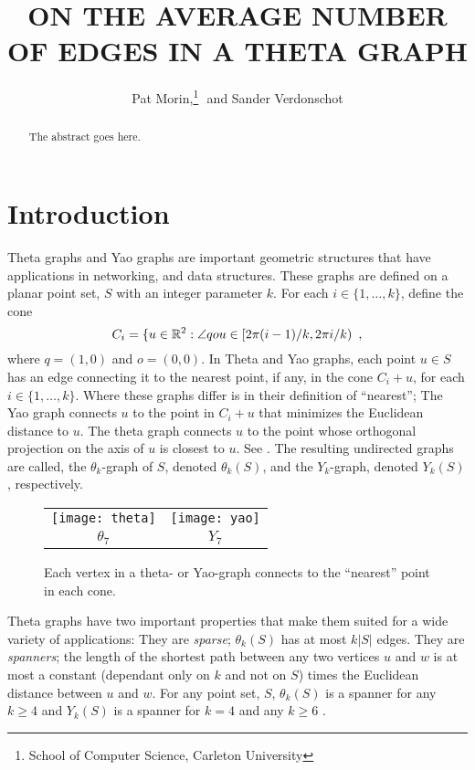 \documentclass{patmorin}
\title{\MakeUppercase{On the Average Number of Edges in a Theta Graph}}
\author{Pat Morin,\thanks{School of Computer Science, Carleton University}\,\,
         and Sander Verdonschot\footnotemark[1]}
\begin{document}
\maketitle

\begin{abstract}
  The abstract goes here.
\end{abstract}

\section{Introduction}

Theta graphs \cite{keil.gutwin:classes} and Yao graphs \cite{yao:blah}
are important geometric structures that have applications in networking,
and data structures.  These graphs are defined on a planar point set,
$S$ with an integer parameter $k$.  For each $i\in\{1,\ldots, k\}$,
define the cone
\[ 
   C_i=\{u\in \mathbb{R}^2: \angle qou\in [2\pi(i-1)/k,2\pi i/k) \enspace ,
\]
where $q=(1,0)$ and $o=(0,0)$.  In Theta and Yao graphs, each point $u\in
S$ has an edge connecting it to the nearest point, if any, in the cone
$C_i+u$, for each $i\in\{1,\ldots,k\}$. Where these graphs differ is in
their definition of ``nearest''; The Yao graph connects $u$ to the point
in $C_i+u$ that minimizes the Euclidean distance to $u$.  The theta graph
connects $u$ to the point whose orthogonal projection on the axis of $u$
is closest to $u$.  See . The resulting undirected
graphs are called, the $\theta_k$-graph of $S$, denoted $\theta_k(S)$,
and the $Y_k$-graph, denoted $Y_k(S)$, respectively.

\begin{figure}
  \begin{center}
    \begin{tabular}{cc}
     \texttt{[image: theta]} & \texttt{[image: yao]} \\
     $\theta_7$ & $Y_7$
    \end{tabular}
  \end{center}
  \caption{Each vertex in a theta- or Yao-graph connects to the ``nearest''
   point in each cone.}
\end{figure}

Theta graphs have two important properties that make them suited for
a wide variety of applications:  They are \emph{sparse}; $\theta_k(S)$
has at most $k|S|$ edges.  They are \emph{spanners}; the length of the
shortest path between any two vertices $u$ and $w$ is at most a constant
(dependant only on $k$ and not on $S$) times the Euclidean distance
between $u$ and $w$.  For any point set, $S$, $\theta_k(S)$ is a spanner
for any $k\ge 4$ \cite{a,b,c,d,e,f} and $Y_k(S)$ is a spanner for $k=4$
and any $k\ge 6$ \cite{a,b,c,d}.
\end{document}
